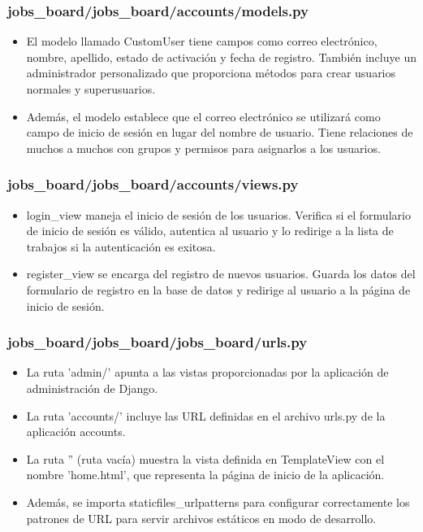 \documentclass{article}
\begin{document}
    \subsubsection{jobs\_board/jobs\_board/accounts/models.py}
    \begin{itemize}
        \item El modelo llamado CustomUser tiene campos como correo electrónico, nombre, apellido, estado de activación y fecha de registro. También incluye un administrador personalizado que proporciona métodos para crear usuarios normales y superusuarios.
        \item Además, el modelo establece que el correo electrónico se utilizará como campo de inicio de sesión en lugar del nombre de usuario. Tiene relaciones de muchos a muchos con grupos y permisos para asignarlos a los usuarios.
        
    
    \end{itemize}
    \subsubsection{jobs\_board/jobs\_board/accounts/views.py}
    \begin{itemize}
        \item login\_view maneja el inicio de sesión de los usuarios. Verifica si el formulario de inicio de sesión es válido, autentica al usuario y lo redirige a la lista de trabajos si la autenticación es exitosa.

        \item register\_view se encarga del registro de nuevos usuarios. Guarda los datos del formulario de registro en la base de datos y redirige al usuario a la página de inicio de sesión.
        
    
    \end{itemize}
    \subsubsection{jobs\_board/jobs\_board/jobs\_board/urls.py}
    \begin{itemize}
        \item La ruta 'admin/' apunta a las vistas proporcionadas por la aplicación de administración de Django.
        \item La ruta 'accounts/' incluye las URL definidas en el archivo urls.py de la aplicación accounts.
        \item La ruta '' (ruta vacía) muestra la vista definida en TemplateView con el nombre 'home.html', que representa la página de inicio de la aplicación.
        \item Además, se importa staticfiles\_urlpatterns para configurar correctamente los patrones de URL para servir archivos estáticos en modo de desarrollo.
        
    
    \end{itemize}
\end{document}
